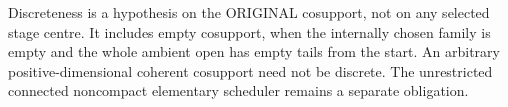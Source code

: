 \begin{remark}
Discreteness is a hypothesis on the ORIGINAL cosupport,
not on any selected stage centre. It includes empty
cosupport, when the internally chosen family is empty
and the whole ambient open has empty tails from the start.
An arbitrary positive-dimensional coherent cosupport need
not be discrete. The unrestricted connected noncompact
elementary scheduler remains a separate obligation.
\end{remark}
